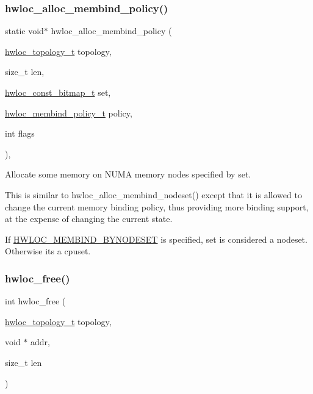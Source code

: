 \subsubsection{\texorpdfstring{hwloc\+\_\+alloc\+\_\+membind\+\_\+policy()}{hwloc\_alloc\_membind\_policy()}}
{\footnotesize\ttfamily static void$\ast$ hwloc\+\_\+alloc\+\_\+membind\+\_\+policy (\begin{DoxyParamCaption}\item[{\hyperlink{a00186_ga9d1e76ee15a7dee158b786c30b6a6e38}{hwloc\+\_\+topology\+\_\+t}}]{topology,  }\item[{size\+\_\+t}]{len,  }\item[{\hyperlink{a00205_gae991a108af01d408be2776c5b2c467b2}{hwloc\+\_\+const\+\_\+bitmap\+\_\+t}}]{set,  }\item[{\hyperlink{a00191_gac9764f79505775d06407b40f5e4661e8}{hwloc\+\_\+membind\+\_\+policy\+\_\+t}}]{policy,  }\item[{int}]{flags }\end{DoxyParamCaption})\hspace{0.3cm}{\ttfamily [inline]}, {\ttfamily [static]}}



Allocate some memory on N\+U\+MA memory nodes specified by {\ttfamily set}. 

This is similar to hwloc\+\_\+alloc\+\_\+membind\+\_\+nodeset() except that it is allowed to change the current memory binding policy, thus providing more binding support, at the expense of changing the current state.

If \hyperlink{a00191_ggab00475fd98815bf4fb9aaf752030e7d2a71f19fe4505f1c083dc8e6f7bdea6256}{H\+W\+L\+O\+C\+\_\+\+M\+E\+M\+B\+I\+N\+D\+\_\+\+B\+Y\+N\+O\+D\+E\+S\+ET} is specified, set is considered a nodeset. Otherwise it\textquotesingle{}s a cpuset. \mbox{\label{a00191_ga32dbd4f54e9e4a7179f2dde37ffe6ad7}} 
\subsubsection{\texorpdfstring{hwloc\+\_\+free()}{hwloc\_free()}}
{\footnotesize\ttfamily int hwloc\+\_\+free (\begin{DoxyParamCaption}\item[{\hyperlink{a00186_ga9d1e76ee15a7dee158b786c30b6a6e38}{hwloc\+\_\+topology\+\_\+t}}]{topology,  }\item[{void $\ast$}]{addr,  }\item[{size\+\_\+t}]{len }\end{DoxyParamCaption})}



